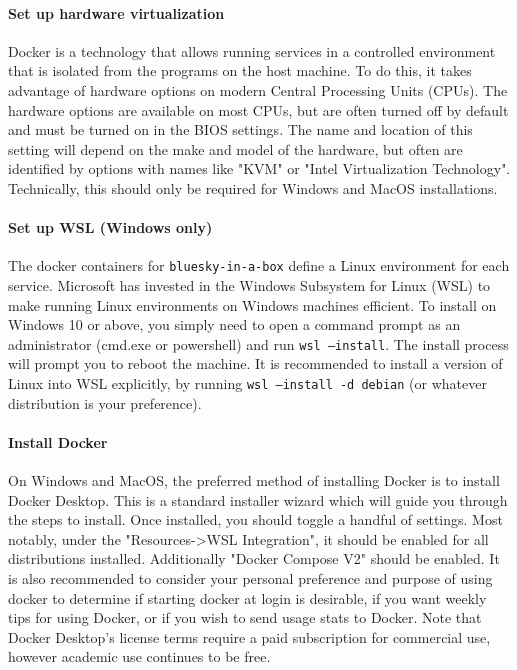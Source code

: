 \paragraph{Set up hardware virtualization}

Docker is a technology that allows running services in a controlled environment that is isolated from the programs on the host machine.
To do this, it takes advantage of hardware options on modern Central Processing Units (CPUs).
The hardware options are available on most CPUs, but are often turned off by default and must be turned on in the BIOS settings.
The name and location of this setting will depend on the make and model of the hardware, but often are identified by options with names like "KVM" or "Intel Virtualization Technology".
Technically, this should only be required for Windows and MacOS installations.

\paragraph{Set up WSL (Windows only)}

The docker containers for \texttt{bluesky-in-a-box} define a Linux\cite{} environment for each service.
Microsoft has invested in the Windows Subsystem for Linux (WSL)\cite{} to make running Linux environments on Windows machines efficient.
To install on Windows 10 or above, you simply need to open a command prompt as an administrator (cmd.exe or powershell) and run \texttt{wsl --install}.
The install process will prompt you to reboot the machine.
It is recommended to install a version of Linux into WSL explicitly, by running \texttt{wsl --install -d debian} (or whatever distribution is your preference).

\paragraph{Install Docker}

On Windows and MacOS, the preferred method of installing Docker is to install Docker Desktop\cite{}.
This is a standard installer wizard which will guide you through the steps to install.
Once installed, you should toggle a handful of settings.
Most notably, under the "Resources->WSL Integration", it should be enabled for all distributions installed.
Additionally "Docker Compose V2" should be enabled.
It is also recommended to consider your personal preference and purpose of using docker to determine if starting docker at login is desirable, if you want weekly tips for using Docker, or if you wish to send usage stats to Docker.
Note that Docker Desktop's license terms require a paid subscription for commercial use, however academic use continues to be free.


